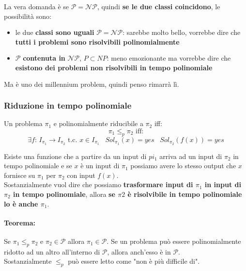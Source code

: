 La vera domanda è se $\mathcal{P} = \mathcal{NP}$, quindi \textbf{se le due classi coincidono}, le possibilità sono: 
\begin{itemize}
	\item le due \textbf{classi sono uguali} $\mathcal{P} = \mathcal{NP}$: sarebbe molto bello, vorrebbe dire che \textbf{tutti i problemi sono risolvibili polinomialmente}
	\item $\mathcal{P}$ \textbf{contenuta in} $\mathcal{NP}$, $P \subset NP$: meno emozionante ma vorrebbe dire che \textbf{esistono dei problemi non risolvibili in tempo polinomiale}
\end{itemize}
Ma è uno dei millennium problem, quindi penso rimarrà lì.\\

\subsubsection{Riduzione in tempo polinomiale}

Un problema $\pi_1$ e polinomialmente riducibile a $\pi_2$ iff: 
$$ \pi_1 \leq_p \pi_2 \text{ iff:}$$
$$ \exists f : \, I_{\pi_1} \rightarrow I_{\pi_2} \text{ t.c. } x \in I_{\pi_1} \;\;\; Sol_{\pi_1} (x) = yes \;\;\; Sol_{\pi_2} (f(x)) = yes $$ 

Esiste una funzione che a partire da un input di $pi_1$ arriva ad un input di $\pi_2$ in tempo polinomiale e se $x$ è un input di $\pi_1$ possiamo avere lo stesso output che $x$ fornisce su $\pi_1$ per $\pi_2$ con input $f(x)$. \\

Sostanzialmente vuol dire che possiamo \textbf{trasformare input di $\pi_1$ in input di $\pi_2$ in tempo polinomiale}, allora \textbf{se $\pi 2$ è risolvibile in tempo polinomiale lo è anche $\pi_1$}.\\

\paragraph{Teorema:} Se $\pi_1 \leq_p \pi_2$ e $\pi_2 \in \mathcal{P}$ allora $\pi_1 \in \mathcal{P}$. Se un problema può essere polinomialmente ridotto ad un altro all'interno di $\mathcal{P}$, allora anch'esso è in $\mathcal{P}$.\\
Sostanzialmente $\leq_p$ può essere letto come "non è più difficile di".\\

